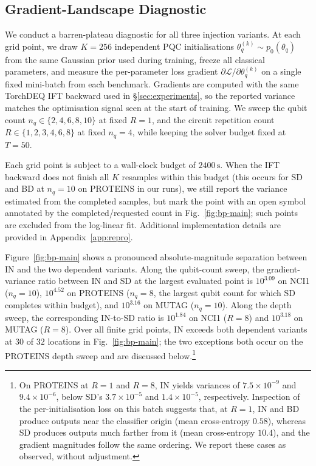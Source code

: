 \subsection{Gradient-Landscape Diagnostic}\label{sec:bp}

We conduct a barren-plateau diagnostic \cite{BarrenPlateauOriginal,Ragone2024,Fontana2024} for all three injection variants. At each grid point, we draw $K=256$ independent PQC initialisations $\theta_q^{(k)}\sim p_0(\theta_q)$ from the same Gaussian prior used during training, freeze all classical parameters, and measure the per-parameter loss gradient $\partial\mathcal{L}/\partial\theta_q^{(k)}$ on a single fixed mini-batch from each benchmark. Gradients are computed with the same TorchDEQ IFT backward used in \S\ref{sec:experiments}, so the reported variance matches the optimisation signal seen at the start of training. We sweep the qubit count $n_q\in\{2,4,6,8,10\}$ at fixed $R=1$, and the circuit repetition count $R\in\{1,2,3,4,6,8\}$ at fixed $n_q=4$, while keeping the solver budget fixed at $T=50$. 

Each grid point is subject to a wall-clock budget of $2400\,\mathrm{s}$. When the IFT backward does not finish all $K$ resamples within this budget (this occurs for SD and BD at $n_q=10$ on PROTEINS in our runs), we still report the variance estimated from the completed samples, but mark the point with an open symbol annotated by the completed/requested count in Fig.~\ref{fig:bp-main}; such points are excluded from the log-linear fit. Additional implementation details are provided in Appendix~\ref{app:repro}.


Figure~\ref{fig:bp-main} shows a pronounced absolute-magnitude separation between IN and the two dependent variants. Along the qubit-count sweep, the gradient-variance ratio between IN and SD at the largest evaluated point is $10^{3.09}$ on NCI1 ($n_q=10$), $10^{4.52}$ on PROTEINS ($n_q=8$, the largest qubit count for which SD completes within budget), and $10^{3.16}$ on MUTAG ($n_q=10$). Along the depth sweep, the corresponding IN-to-SD ratio is $10^{1.84}$ on NCI1 ($R=8$) and $10^{3.18}$ on MUTAG ($R=8$). Over all finite grid points, IN exceeds both dependent variants at $30$ of $32$ locations in Fig.~\ref{fig:bp-main}; the two exceptions both occur on the PROTEINS depth sweep and are discussed below.\footnote{On PROTEINS at $R=1$ and $R=8$, IN yields variances of $7.5\times 10^{-9}$ and $9.4\times 10^{-6}$, below SD's $3.7\times 10^{-5}$ and $1.4\times 10^{-5}$, respectively. Inspection of the per-initialisation loss on this batch suggests that, at $R=1$, IN and BD produce outputs near the classifier origin (mean cross-entropy $0.58$), whereas SD produces outputs much farther from it (mean cross-entropy $10.4$), and the gradient magnitudes follow the same ordering. We report these cases as observed, without adjustment.}

